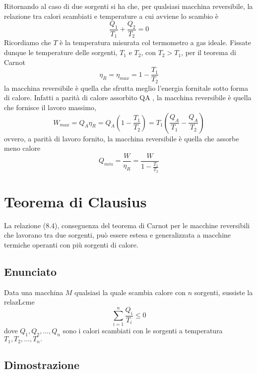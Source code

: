 \documentclass[class=book, crop=false, oneside, 12pt]{standalone}
\begin{document}
Ritornando al caso di due sorgenti si ha che, per qualsiasi macchina reversibile, la relazione tra calori scambiati e temperature a cui avviene lo scambio è
\begin{equation}
    \frac{Q_1}{T_1} + \frac{Q_2}{T_2} = 0
\end{equation}
Ricordiamo che \(T\) è la temperatura misurata col termometro a gas ideale. 
Fissate dunque le temperature delle sorgenti, \(T_1\) e \(T_2\), con \(T_2 > T_1\), per il teorema di Carnot
\begin{equation}
    \eta_R = \eta_{max} = 1- \frac{T_1}{T_2}
\end{equation}
la macchina reversibile è quella che sfrutta meglio l'energia fornitale sotto forma di calore.
Infatti a parità di calore assorbito QA , la macchina reversibile è quella che fornisce il lavoro massimo, 
\begin{equation}
    W_{max} = Q_A \eta_R = Q_A \left(1 - \frac{T_1}{T_2}\right) = T_1 \left(\frac{Q_A}{T_1} - \frac{Q_A}{T_2}\right)
\end{equation}
ovvero, a parità di lavoro fornito, la macchina reversibile è quella che assorbe meno calore
\begin{equation}
    Q_{min} = \frac{W}{\eta_R} = \frac{W}{1- \frac{T_1}{T_2}}
\end{equation}

\section{Teorema di Clausius}

La relazione (8.4), conseguenza del teorema di Carnot per le macchine reversibili che lavorano tra due sorgenti, può essere estesa e generalizzata a macchine termiche operanti con più sorgenti di calore. 

\subsection{Enunciato}

Data una macchina \(M\) qualsiasi la quale scambia calore con \(n\) sorgenti, sussiste la relazLcme 
\begin{equation}
    \sum_{i = 1}^{n} \frac{Q_i}{T_i} \leq 0
\end{equation}
dove \(Q_1, Q_2, ... , Q_n\) sono i calori scambiati con le sorgenti a temperatura \(T_1, T_2, ... , T_n.\)

\subsection{Dimostrazione}
\end{document}
